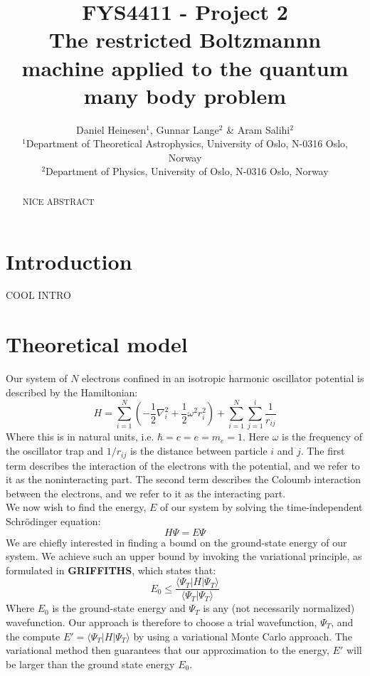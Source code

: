 \documentclass[a4paper, 10pt]{article}
\title{FYS4411 - Project 2\\
	The restricted Boltzmannn machine applied to the quantum many body problem}
\author{Daniel Heinesen$^1$, Gunnar Lange$^2$ \& Aram Salihi$^2$\\
	\small $^1$Department of Theoretical Astrophysics, University of Oslo, N-0316 Oslo, Norway\\
	\small $^2$Department of Physics, University of Oslo, N-0316 Oslo, Norway}
\begin{document}
	\maketitle
	\begin{abstract}
	\begin{center}
	 NICE ABSTRACT
\end{center}
	\end{abstract}
	\newpage
	\tableofcontents
	\newpage
	\section{Introduction}
	COOL INTRO
	\section{Theoretical model}
	Our system of $N$ electrons confined in an isotropic harmonic oscillator potential is described by the Hamiltonian:
	\begin{equation}
	H=\sum_{i=1}^N \left(-\frac{1}{2}\nabla_i^2 +\frac{1}{2}\omega^2 r_i^2\right)+\sum_{i=1}^N \sum_{j=1}^{i}\frac{1}{r_{ij}}
	\end{equation}
	Where this is in natural units, i.e. $\hbar=c=e=m_e=1$. Here $\omega$ is the frequency of the oscillator trap and $1/r_{ij}$ is the distance between particle $i$ and $j$. The first term describes the interaction of the electrons with the potential, and we refer to it as the noninteracting part. The second term describes the Coloumb interaction between the electrons, and we refer to it as the interacting part.\\
	\linebreak
	We now wish to find the energy, $E$ of our system by solving the time-independent Schrödinger equation:
	\begin{equation}\label{eq:time_depenedent_schrodinger}
	H\Psi = E\Psi
	\end{equation}
	We are chiefly interested in finding a bound on the ground-state energy of our system. We achieve such an upper bound by invoking the variational principle, as formulated in \textbf{GRIFFITHS}, which states that:
	\begin{equation}
	E_0\leq \frac{\langle \Psi_T | H |\Psi_T \rangle}{\langle \Psi_T | \Psi_T \rangle}
	\end{equation} 
	Where $E_0$ is the ground-state energy and $\Psi_T$ is any (not necessarily normalized) wavefunction. Our approach is therefore to choose a trial wavefunction, $\Psi_T$, and the compute $E'=\langle \Psi_T | H |\Psi_T\rangle$ by using a variational Monte Carlo approach. The variational method then guarantees that our approximation to the energy, $E'$ will be larger than the ground state energy $E_0$. 
\end{document}
